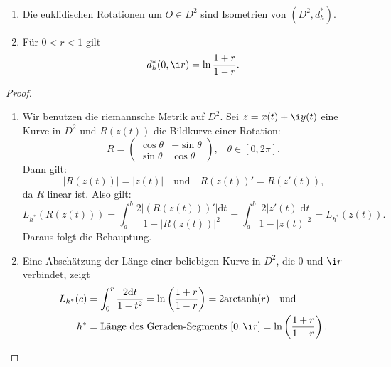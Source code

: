 
\begin{theorem}
  \
  \begin{enumerate}
    \item Die euklidischen Rotationen um \( O \in D^2 \) sind Isometrien von \( (D^2, d_h^\ast) \).
    \item Für \( 0 < r < 1 \) gilt
    \begin{equation*}
      d_h^\ast(0,\i r) = \ln\frac{1+r}{1-r}\text{.}
    \end{equation*}
  \end{enumerate}
  \begin{proof}
    \
    \begin{enumerate}
      \item Wir benutzen die riemannsche Metrik auf \( D^2 \). Sei \( z = x(t) + \i y(t) \) eine Kurve in \( D^2 \) und \( R(z(t)) \) die Bildkurve einer Rotation:
      \begin{equation*}
        R = \begin{pmatrix}
          \cos \theta & - \sin \theta \\
          \sin \theta & \cos \theta
        \end{pmatrix}\text{,}\quad \theta \in [0,2\pi]\text{.}
      \end{equation*}
      Dann gilt:
      \begin{equation*}
        \left\vert R(z(t)) \right\vert = \left\vert z(t) \right\vert \quad \text{und} \quad R(z(t))' = R(z'(t))\text{,}
      \end{equation*}
      da \( R \) linear ist. Also gilt:
      \begin{equation*}
        L_{h^\ast}(R(z(t))) = \int_a^b \frac{2\left\vert (R(z(t)))' \right\vert\text{d}t}{1-\left\vert R(z(t)) \right\vert^2} = \int_a^b \frac{2\left\vert z'(t) \right\vert\text{d}t}{1-\left\vert z(t) \right\vert^2} = L_{h^\ast}(z(t))\text{.}
      \end{equation*}
      Daraus folgt die Behauptung.

      \item Eine Abschätzung der Länge einer beliebigen Kurve in \( D^2 \), die \( 0 \) und \( \i r \) verbindet, zeigt
      \begin{align*}
        L_{h^\ast}(c) &= \int_0^r \frac{2\text{d}t}{1-t^2} = \ln\left( \frac{1+r}{1-r} \right) = 2\text{arctanh}(r) \quad \text{und} \\
        h^\ast &= \text{Länge des Geraden-Segments } [0,\i r] = \ln\left( \frac{1+r}{1-r} \right)\text{.}
      \end{align*}
    \end{enumerate}
  \end{proof}
\end{theorem}

